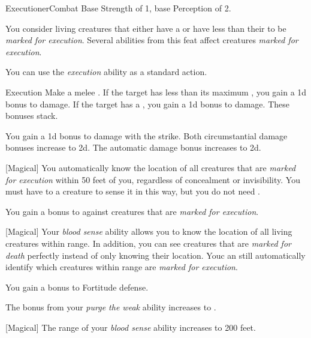     \begin{feat}{Executioner}{Combat}
        \featpres Base Strength of 1, base Perception of 2.

         You consider living creatures that either have a  or have less than their  to be \textit{marked for execution}.
        Several abilities from this feat affect creatures \textit{marked for execution}.

         You can use the \textit{execution} ability as a standard action.
        \begin{freeability}{Execution}
            Make a melee .
            If the target has less than its maximum , you gain a \plus1d bonus to damage.
            If the target has a , you gain a \plus1d bonus to damage.
            These bonuses stack.

            \rankline
             You gain a \plus1d bonus to damage with the strike.
             Both circumstantial damage bonuses increase to \plus2d.
             The automatic damage bonus increases to \plus2d.
        \end{freeability}

        [Magical] You automatically know the location of all creatures that are \textit{marked for execution} within 50 feet of you, regardless of concealment or invisibility.
        You must have  to a creature to sense it in this way, but you do not need .

         You gain a  bonus to  against creatures that are \textit{marked for execution}.

        [Magical] Your \textit{blood sense} ability allows you to know the location of all living creatures within range.
        In addition, you can see creatures that are \textit{marked for death} perfectly instead of only knowing their location.
        Youc an still automatically identify which creatures within range are \textit{marked for execution}.

         You gain a  bonus to Fortitude defense.

         The bonus from your \textit{purge the weak} ability increases to .

        [Magical] The range of your \textit{blood sense} ability increases to 200 feet.
    \end{feat}

